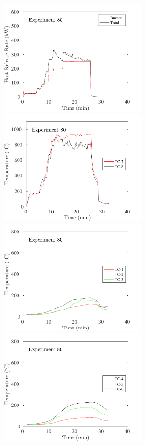 \begin{figure}[H]
\includegraphics[height=2.30in]{../SCRIPT_FIGURES/Test_80_HRR} \hfill
\includegraphics[height=2.30in]{../SCRIPT_FIGURES/Test_80_TC_7-8} \\
\includegraphics[height=2.30in]{../SCRIPT_FIGURES/Test_80_TC_1-3} \hfill
\includegraphics[height=2.30in]{../SCRIPT_FIGURES/Test_80_TC_4-6}

\end{figure}
